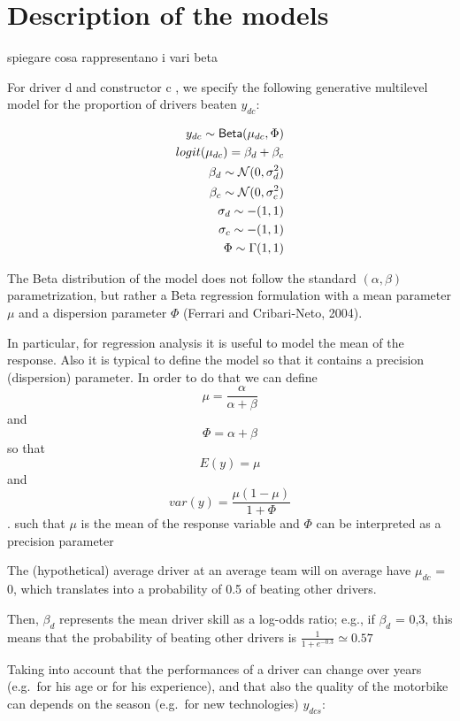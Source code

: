 \documentclass[
]{article}
\begin{document}
\hypertarget{description-of-the-models}{%
\section{Description of the models}\label{description-of-the-models}}

spiegare cosa rappresentano i vari beta

For driver d and constructor c , we specify the following generative
multilevel model for the proportion of drivers beaten \(y_{dc}\):

\[\begin{align*} y_{dc} \sim {\sf Beta}(\mu_{dc},\Phi) \\ logit(\mu_{dc}) = \beta_{d}  + \beta_{c}  \\ \beta_{d} \sim {\mathcal N}(0,\sigma^{2}_{d}) \\  \beta_{c} \sim {\mathcal N}(0,\sigma^{2}_{c}) \\ \sigma_{d} \sim {\mathcal \Gamma}(1,1) \\ \sigma_{c} \sim {\mathcal \Gamma}(1,1) \\ \Phi \sim \Gamma(1,1) \end{align*}\]

The Beta distribution of the model does not follow the standard
\((\alpha,\beta)\) parametrization, but rather a Beta regression
formulation with a mean parameter \(\mu\) and a dispersion parameter
\(\Phi\) (Ferrari and Cribari-Neto, 2004).

In particular, for regression analysis it is useful to model the mean of
the response. Also it is typical to define the model so that it contains
a precision (dispersion) parameter. In order to do that we can define
\[\mu = \frac{\alpha}{\alpha+\beta}\] and \[\Phi = \alpha + \beta\] so
that \[E(y) = \mu\] and \[var(y) = \frac{\mu(1-\mu)}{1+\Phi}\]. such
that \(\mu\) is the mean of the response variable and \(\Phi\) can be
interpreted as a precision parameter

The (hypothetical) average driver at an average team will on average
have \(\mu_{dc}\) = 0, which translates into a probability of 0.5 of
beating other drivers.

Then, \(\beta_{d}\) represents the mean driver skill as a log-odds
ratio; e.g., if \(\beta_{d}\) = 0,3, this means that the probability of
beating other drivers is \(\frac{1}{1 + e^{-0.3}} \simeq 0.57\)

Taking into account that the performances of a driver can change over
years (e.g.~for his age or for his experience), and that also the
quality of the motorbike can depends on the season (e.g.~for new
technologies) \(y_{dcs}\):
\end{document}
